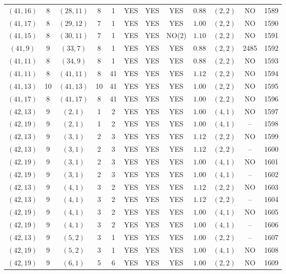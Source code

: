 \begin{longtable}{|c|c|c|c|c|c|c|c|c|c|c|c|}
$(41,16)$ & 8 & $(28,11)$ & 8 & 1 & YES & YES & YES & $0.88$ & $(2,2)$ & NO & 1589\\
$(41,17)$ & 8 & $(29,12)$ & 7 & 1 & YES & YES & YES & $1.00$ & $(2,2)$ & NO & 1590\\
$(41,15)$ & 8 & $(30,11)$ & 7 & 1 & YES & YES & NO(2) & $1.10$ & $(2,2)$ & NO & 1591\\
$(41,9)$ & 9 & $(33,7)$ & 8 & 1 & YES & YES & YES & $0.88$ & $(2,2)$ & 2485 & 1592\\
$(41,11)$ & 8 & $(34,9)$ & 8 & 1 & YES & YES & YES & $0.88$ & $(2,2)$ & NO & 1593\\
$(41,11)$ & 8 & $(41,11)$ & 8 & 41 & YES & YES & YES & $1.12$ & $(2,2)$ & NO & 1594\\
$(41,13)$ & 10 & $(41,13)$ & 10 & 41 & YES & YES & YES & $1.00$ & $(2,2)$ & NO & 1595\\
$(41,17)$ & 8 & $(41,17)$ & 8 & 41 & YES & YES & YES & $1.00$ & $(2,2)$ & NO & 1596\\
$(42,13)$ & 9 & $(2,1)$ & 1 & 2 & YES & YES & YES & $1.00$ & $(4,1)$ & NO & 1597\\
$(42,19)$ & 9 & $(2,1)$ & 1 & 2 & YES & YES & YES & $1.00$ & $(4,1)$ & -- & 1598\\
$(42,13)$ & 9 & $(3,1)$ & 2 & 3 & YES & YES & YES & $1.12$ & $(2,2)$ & NO & 1599\\
$(42,13)$ & 9 & $(3,1)$ & 2 & 3 & YES & YES & YES & $1.12$ & $(2,2)$ & -- & 1600\\
$(42,19)$ & 9 & $(3,1)$ & 2 & 3 & YES & YES & YES & $1.00$ & $(4,1)$ & NO & 1601\\
$(42,19)$ & 9 & $(3,1)$ & 2 & 3 & YES & YES & YES & $1.00$ & $(4,1)$ & -- & 1602\\
$(42,13)$ & 9 & $(4,1)$ & 3 & 2 & YES & YES & YES & $1.12$ & $(2,2)$ & NO & 1603\\
$(42,13)$ & 9 & $(4,1)$ & 3 & 2 & YES & YES & YES & $1.12$ & $(2,2)$ & -- & 1604\\
$(42,19)$ & 9 & $(4,1)$ & 3 & 2 & YES & YES & YES & $1.00$ & $(4,1)$ & NO & 1605\\
$(42,19)$ & 9 & $(4,1)$ & 3 & 2 & YES & YES & YES & $1.00$ & $(4,1)$ & -- & 1606\\
$(42,13)$ & 9 & $(5,2)$ & 3 & 1 & YES & YES & YES & $1.00$ & $(2,2)$ & -- & 1607\\
$(42,19)$ & 9 & $(5,2)$ & 3 & 1 & YES & YES & YES & $1.00$ & $(4,1)$ & NO & 1608\\
$(42,19)$ & 9 & $(6,1)$ & 5 & 6 & YES & YES & YES & $1.00$ & $(2,2)$ & NO & 1609\\

\end{longtable}
